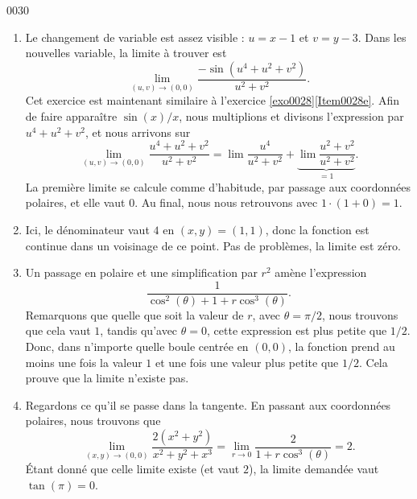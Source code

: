 
\begin{corrige}{0030}

\begin{enumerate}
\item
Le changement de variable est assez visible : $u=x-1$ et $v=y-3$. Dans les nouvelles variable, la limite à trouver est
\begin{equation}
	\lim_{(u,v)\to(0,0)}\frac{ -\sin(u^4+u^2+v^2) }{ u^2+v^2 }.
\end{equation}
Cet exercice est maintenant similaire à l'exercice \ref{exo0028}\ref{Item0028e}. Afin de faire apparaître $\sin(x)/x$, nous multiplions et divisons l'expression par $u^4+u^2+v^2$, et nous arrivons sur
\begin{equation}
	\lim_{(u,v)\to(0,0)}\frac{ u^4+u^2+v^2 }{ u^2+v^2 }=\lim\frac{ u^4 }{ u^2+v^2 }+\underbrace{\lim\frac{ u^2+v^2 }{ u^2+v^2 }}_{=1}.
\end{equation}
La première limite se calcule comme d'habitude, par passage aux coordonnées polaires, et elle vaut $0$. Au final, nous nous retrouvons avec $1\cdot(1+0)=1$.

\item
Ici, le dénominateur vaut $4$ en $(x,y)=(1,1)$, donc la fonction est continue dans un voisinage de ce point. Pas de problèmes, la limite est zéro.

\item
Un passage en polaire et une simplification par $r^2$ amène l'expression
\begin{equation}
	\frac{1}{ \cos^2(\theta)+1+r\cos^3(\theta) }.
\end{equation}
Remarquons que quelle que soit la valeur de $r$, avec $\theta=\pi/2$, nous trouvons que cela vaut $1$, tandis qu'avec $\theta=0$, cette expression est plus petite que $1/2$. Donc, dans n'importe quelle boule centrée en $(0,0)$, la fonction prend au moins une fois la valeur $1$ et une fois une valeur plus petite que $1/2$. Cela prouve que la limite n'existe pas.

\item
Regardons ce qu'il se passe dans la tangente. En passant aux coordonnées polaires, nous trouvons que
\begin{equation}
	\lim_{(x,y)\to(0,0)}\frac{ 2(x^2+y^2) }{ x^2+y^2+x^3 }=\lim_{r\to 0}\frac{ 2 }{ 1+r\cos^3(\theta) }=2.
\end{equation}
Étant donné que celle limite existe (et vaut $2$), la limite demandée vaut $\tan(\pi)=0$.

\end{enumerate}

\end{corrige}
